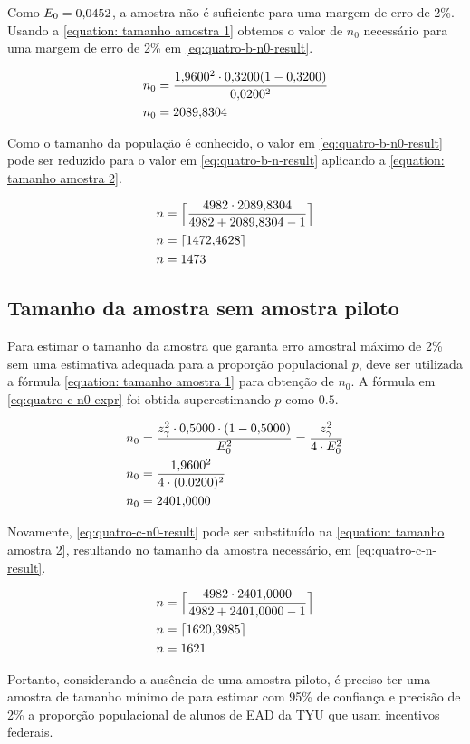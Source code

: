 	Como $E_0 = \num{0.0452}$, a amostra não é suficiente para uma margem de
	erro de 2\%. Usando a \autoref{equation: tamanho amostra 1} obtemos o valor de $n_0$ 
    necessário para uma margem de erro de 2\% em \eqref{eq:quatro-b-n0-result}.

	\begin{align}
		n_0 &= \frac{\num{1.96}^2 \cdot \num{0.32}(1-\num{0.32})}{\num{0.02}^2} \nonumber \\
		n_0 &= \label{eq:quatro-b-n0-result}
			   \num{2089.8304}	
	\end{align}

	Como o tamanho da população é conhecido, o valor em
	\eqref{eq:quatro-b-n0-result} pode ser reduzido para o valor em
	\eqref{eq:quatro-b-n-result} aplicando a \autoref{equation: tamanho amostra 2}.

	\begin{align}
		n &= \Big\lceil \frac{4982 \cdot  \num{2089.8304}}{4982 + \num{2089.8304} - 1} \nonumber \Big\rceil \\
		n &= \lceil \num{1472.4628} \nonumber \rceil \\
		n &= \label{eq:quatro-b-n-result} 1473
	\end{align}

\subsection{Tamanho da amostra sem amostra piloto}

	Para estimar o tamanho da amostra que garanta erro amostral máximo de
	2\% sem uma estimativa adequada para a proporção populacional $p$, deve
	ser utilizada a fórmula \autoref{equation: tamanho amostra 1} para obtenção de
	$n_0$. A fórmula em \eqref{eq:quatro-c-n0-expr} foi obtida
	superestimando $p$ como $\num{0.5}$.

	\begin{align}
		n_0 &= \label{eq:quatro-c-n0-expr}
               \frac{z_\gamma^2 \cdot \num{0.5} \cdot (1 - \num{0.5})}{E_0^2} = \frac{z_\gamma^2}{4 \cdot E_0^2} \\
		n_0	&= \frac{\num{1.96}^2}{4 \cdot (\num{0.02})^2} \nonumber \\
		n_0	&= \label{eq:quatro-c-n0-result}
			   \num{2401.0000}
	\end{align}

	Novamente, \eqref{eq:quatro-c-n0-result} pode ser substituído na 
    \autoref{equation: tamanho amostra 2}, resultando no tamanho da amostra necessário, em
	\eqref{eq:quatro-c-n-result}.

	\begin{align}
		n &= \Big\lceil \frac{4982 \cdot \num{2401.0000}}{4982 + \num{2401.0000} -1} \nonumber \Big\rceil \\
		n &= \lceil \num{1620.3985} \nonumber \rceil \\
		n &= \label{eq:quatro-c-n-result} 
			 1621
	\end{align}

	Portanto, considerando a ausência de uma amostra piloto, é preciso ter
	uma amostra de tamanho mínimo de \QUATROCnceil para estimar com 95\% de
	confiança e precisão de 2\% a proporção populacional de alunos de EAD da
	TYU que usam incentivos federais.
